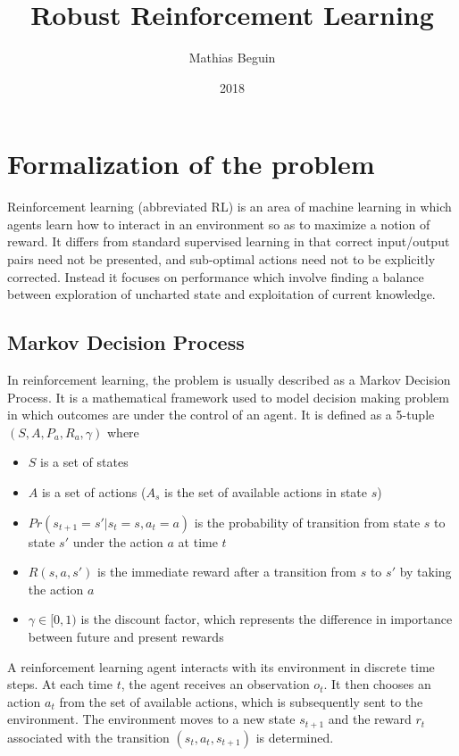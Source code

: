 \documentclass[]{article}
\title{Robust Reinforcement Learning}
\author{Mathias Beguin}
\date{2018}
\begin{document}
 
\begin{titlepage}
\maketitle
\end{titlepage}

\section{Formalization of the problem}
Reinforcement learning (abbreviated RL) is an area of machine learning in which agents learn how to interact in an environment so as to maximize a notion of reward. It differs from standard supervised learning in that correct input/output pairs need not be presented, and sub-optimal actions need not to be explicitly corrected. Instead it focuses on performance which involve finding a balance between exploration of uncharted state and exploitation of current knowledge.


\subsection{Markov Decision Process} \label{section:MDP}
In reinforcement learning, the problem is usually described as a Markov Decision Process. It is a mathematical framework used to model decision making problem in which outcomes are under the control of an agent. It is defined as a 5-tuple $(S, A, P_a, R_a, \gamma)$ where
\begin{itemize}
	\item $S$ is a set of states
	\item $A$ is a set of actions ($A_s$ is the set of available actions in state $s$)
	\item $Pr(s_{t+1} = s' | s_t = s, a_t = a)$ is the probability of transition from state $s$ to state $s'$ under the action $a$ at time $t$
	\item $R(s, a, s')$ is the immediate reward after a transition from $s$ to $s'$ by taking the action $a$
	\item $\gamma \in [0, 1)$ is the discount factor, which represents the difference in importance between future and present rewards
\end{itemize}

A reinforcement learning agent interacts with its environment in discrete time steps. At each time $t$, the agent receives an observation $o_{t}$. It then chooses an action $a_{t}$ from the set of available actions, which is subsequently sent to the environment. The environment moves to a new state $s_{t+1}$ and the reward $r_{t}$ associated with the transition $(s_{t},a_{t},s_{t+1})$ is determined.
\end{document}
